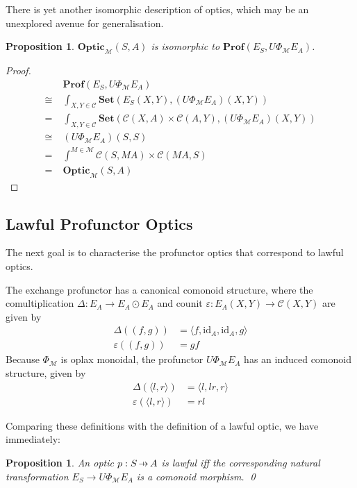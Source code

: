 \documentclass[11pt,a4paper]{article}
\theoremstyle{plain}
\newtheorem{proposition}[theorem]{Proposition}
\theoremstyle{definition}
\newcommand{\C}{\mathscr{C}}
\newcommand{\M}{\mathscr{M}}
\newcommand{\Pastro}{\Phi}
\newcommand{\Set}{\mathbf{Set}}
\newcommand{\Prof}{\mathbf{Prof}}
\newcommand{\Optic}{\mathbf{Optic}}
\newcommand{\id}{\mathrm{id}}
\newcommand{\hto}{\ensuremath{\,\mathaccent\shortmid\rightarrow\,}}
\begin{document}
There is yet another isomorphic description of optics, which may be an unexplored avenue for generalisation.

\begin{proposition}
  $\Optic_\M(S, A)$ is isomorphic to $\Prof(E_S, U \Phi_\M E_A)$.
\end{proposition}
\begin{proof}
  \begin{align*}
    &\Prof(E_S, U \Phi_\M E_A) \\
    \cong\;&\int_{X,Y \in \C} \Set(E_S(X,Y), (U \Phi_\M E_A)(X,Y)) \\
    = \;&\int_{X,Y \in \C} \Set(\C(X,A) \times \C(A,Y), (U \Phi_\M E_A)(X,Y)) \\
    \cong \;& (U \Phi_\M E_A)(S,S) \\
    = \;&\int^{M \in \M} \C(S, MA) \times \C(MA, S) \\
    = \;&\Optic_\M(S, A)
  \end{align*}
\end{proof}

\subsection{Lawful Profunctor Optics}

The next goal is to characterise the profunctor optics that correspond to lawful optics.

The exchange profunctor has a canonical comonoid structure, where the comultiplication $\Delta : E_A \to E_A \odot E_A$ and counit $\varepsilon : E_A(X, Y) \to \C(X, Y)$ are given by
\begin{align*}
  \Delta((f, g)) &= \langle f, \id_A, \id_A, g \rangle \\
  \varepsilon((f, g)) &= gf
\end{align*}
Because $\Pastro_\M$ is oplax monoidal, the profunctor $U\Pastro_\M E_A$ has an induced comonoid structure, given by
\begin{align*}
  \Delta(\langle l, r \rangle) &= \langle l, lr, r \rangle \\
  \varepsilon(\langle l, r \rangle) &= rl
\end{align*}

Comparing these definitions with the definition of a lawful optic, we have immediately:

\begin{proposition}
  An optic $p : S \hto A$ is lawful iff the corresponding natural transformation $E_S \rightarrow U \Phi_\M E_A$ is a comonoid morphism. \qed
\end{proposition}
\end{document}

